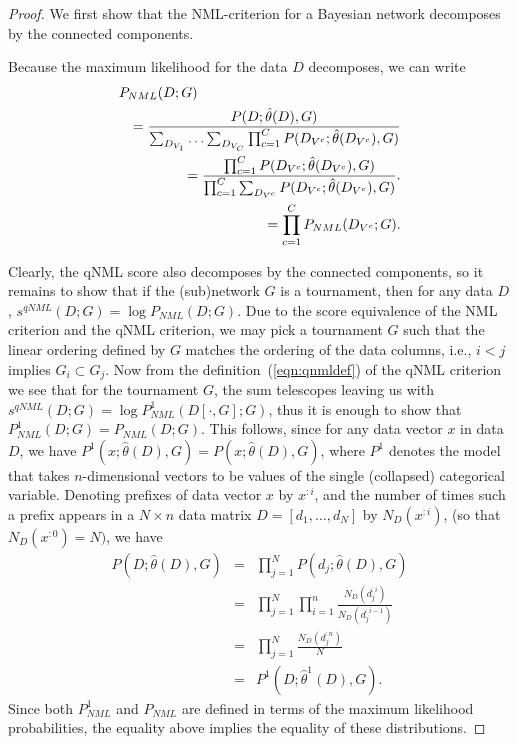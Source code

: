 \begin{proof}
We first show that the NML-criterion for a Bayesian network
decomposes by the connected components.

Because the maximum likelihood for the data $D$ decomposes,
we can write
\begin{eqnarray}
  \lefteqn{P_{NML}(D;G)} \nonumber \\
  && = \frac{P(D;\hat\theta(D),G)}
            {\sum_{D_{V_1}}\ldots \sum_{D_{V_C}}\prod_{c=1}^C P(D_{V^c};\hat\theta(D_{V^c}),G)} \nonumber \\
            && = \frac{\prod_{c=1}^C P(D_{V^c};\hat\theta(D_{V^c}),G)} 
            {\prod_{c=1}^C\sum_{D_{V^c}}P(D_{V^c};\hat\theta(D_{V^c}),G)}.\nonumber \\
            && = \prod_{c=1}^CP_{NML}(D_{V^c};G).
\end{eqnarray}

Clearly, the qNML score also decomposes by the connected components,
so it remains to show that if the (sub)network $G$ is a tournament,
then for any data $D$, $s^{qNML}(D;G)=\log P_{NML}(D;G)$.  Due to the
score equivalence of the NML criterion and the qNML criterion, we may
pick a tournament $G$ such that the linear ordering defined by $G$ matches
the ordering of the data columns, i.e., $i<j$ implies $G_i \subset
G_j$. Now from the definition~(\ref{eqn:qnmldef}) of the qNML
criterion we see that for the tournament $G$, the sum telescopes
leaving us with $s^{qNML}(D;G) = \log P^1_{NML}(D[\cdot,G];G)$, thus
it is enough to show that $P^1_{NML}(D;G)=P_{NML}(D;G)$.  This
follows, since for any data vector $x$ in data $D$, we have
$P^1(x;\hat\theta(D),G) = P(x;\hat\theta(D),G)$, where $P^1$ denotes
the model that takes $n$-dimensional vectors to be values of the
single (collapsed) categorical variable.  Denoting prefixes of data
vector $x$ by $x^{:i}$, and the number of times such a prefix appears
in a $N\times n$ data matrix $D=[d_1,\ldots,d_N]$ by $N_D(x^{:i})$,
(so that $N_D(x^{:0})=N)$, we have
\begin{eqnarray}
  P(D;\hat\theta(D),G) &=& \prod_{j=1}^{N}P(d_j;\hat\theta(D),G) \nonumber \\
  &=& \prod_{j=1}^{N} \prod_{i=1}^{n} \frac{N_D(d_j^{:i})}{N_D(d_j^{:i-1})} \nonumber\\
  &=& \prod_{j=1}^{N} \frac{N_D(d_j^{:n})}{N} \nonumber \\
  &=& P^1(D;\hat\theta^1(D),G).
\end{eqnarray}
Since both $P^1_{NML}$ and $P_{NML}$ are defined in terms of the
maximum likelihood probabilities, the equality above implies the equality
of these distributions.
\end{proof}

